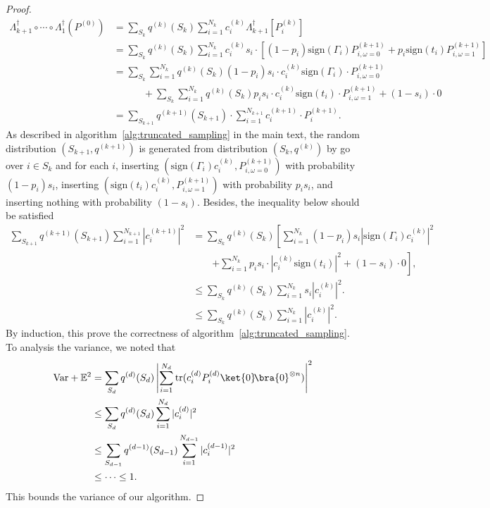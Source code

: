 \documentclass[aps,%
twocolumn,%
floatfix,%
pra,%
amsfonts,%
longbibliography,%
groupedaddress,%
superscriptaddress]{revtex4-2}%
\newcommand{\1}{\mathbbm{1}}
\begin{document}
\begin{proof}
     \begin{align}
        \Lambda_{k+1}^\dagger \circ \cdots\circ\Lambda_1^\dagger(P^{(0)}) &=\sum_{S_k}q^{(k)} (S_k) \sum_{i =1}^{N_k} c_i^{(k)} \Lambda_{k+1}^\dagger[P_i^{(k)}]\\
        &=\sum_{S_k}q^{(k)} (S_k) \sum_{i =1}^{N_k} c_{i}^{(k)} s_{i} \cdot \left[(1-p_{i})\text{sign}(\Gamma_{i})P_{i,\omega=0}^{(k+1)} + p_i\text{sign}(t_i) P_{i,\omega=1}^{(k+1)}\right]\\
        &=\sum_{S_k}\sum_{i =1}^{N_k}q^{(k)} (S_k)(1-p_i) s_i \cdot c_{i}^{(k)} \text{sign}(\Gamma_i) \cdot P_{i,\omega=0}^{(k+1)} \\
        &\quad \quad \quad+ \sum_{S_k}\sum_{i =1}^{N_k}q^{(k)}(S_k)p_i s_i\cdot c_{i}^{(k)} \text{sign}(t_i) \cdot P_{i,\omega=1}^{(k+1)} + (1 - s_i)\cdot 0\\
        &=\sum_{S_{k+1}}q^{(k+1)}(S_{k+1}) \cdot\sum_{i =1}^{N_{k+1}}  c_{i}^{(k+1)}  \cdot P_{i}^{(k+1)}.
    \end{align}
   As described in algorithm~\ref{alg:truncated_sampling} in the main text, the random distribution $(S_{k+1},q^{(k+1)}) $ is generated from distribution $(S_k, q^{(k)})$ by go over $i \in S_k$ and for each $i $, inserting $\left(\text{sign}(\Gamma_i)c_i^{(k)},P_{i,\omega=0}^{(k+1)}\right)$ with probability $(1- p_i)s_i$,   
 inserting $\left(\text{sign}(t_i)c_{i}^{(k)}  ,P_{i,\omega=1}^{(k+1)}\right)$ with probability $p_i s_i$, and inserting nothing with probability $(1 - s_i)$. 
Besides, the inequality below should be satisfied
\begin{align}
   \sum_{S_{k+1}}q^{(k+1)}(S_{k+1}) \sum_{i= 1}^{N_{k+1}} |c_i^{(k+1)} |^2 
    &=\sum_{S_k}q^{(k)}(S_k)\left[\sum_{i =1}^{N_k}(1- p_i)s_i|\text{sign}(\Gamma_i)c_i^{(k)}|^2 \right.\\
    &\quad \quad\left. + \sum_{i =1}^{N_k}p_i s_i\cdot |c_{i}^{(k)} \text{sign}(t_i)|^2  + (1 - s_i)\cdot 0\right ] ,\\
    &\leq  \sum_{S_{k}}q^{(k)}(S_{k}) \sum_{i= 1}^{N_{k}} s_i|c_i^{(k)} |^2.\\
    &\leq  \sum_{S_{k}}q^{(k)}(S_{k}) \sum_{i= 1}^{N_{k}} |c_i^{(k)} |^2.
\end{align}
 By induction, this prove the correctness of algorithm~\ref{alg:truncated_sampling}. 
    To analysis the variance, we noted that
        \begin{align}
        \text{Var} + \mathbb{E}^2 &= \sum_{S_d} q^{(d)}(S_d)\left|\sum_{i =1}^{N_d}\text{tr}(c_i^{(d)}P_i^{(d)} \ket{0}\!\bra{0}^{\otimes n})\right|^2\\
        &\leq  \sum_{S_{d}}q^{(d)}(S_{d}) \sum_{i= 1}^{N_{d}} |c_i^{(d)} |^2 \\
        &\leq \sum_{S_{d-1}}q^{(d-1)}(S_{d-1}) \sum_{i= 1}^{N_{d-1}} |c_i^{(d-1)} |^2\\
         &\leq \cdots \leq 1.
    \end{align}
 This bounds the variance of our algorithm.
\end{proof}
\end{document}
